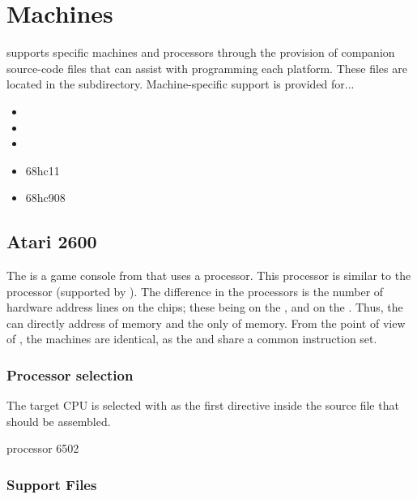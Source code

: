 \chapter{Machines}
\label{Machine}

\dasm supports specific machines and processors through the provision of companion source-code files that can assist with programming each platform. These files are located in the  subdirectory. Machine-specific support is provided for...

\begin{itemize}
\item {}
\item {}
\item {}
\item 68hc11
\item 68hc908
\end{itemize}


\section{Atari 2600}
\label{Machine:atari2600}
\label{changelog:20200908atari}

The  is a game console from  that uses a  processor. This processor is similar to the  processor (supported by \dasm). The difference in the processors is the number of hardware address lines on the chips; these being  on the , and  on the . Thus, the  can directly address  of memory and the  only  of memory.  From the point of view of \dasm, the machines are identical, as the  and  share a common instruction set.

\subsection{Processor selection}

The target CPU is selected with 
as the first directive inside the source file that should be assembled.

\begin{usage}
	processor 6502
\end{usage}


\subsection{Support Files}

